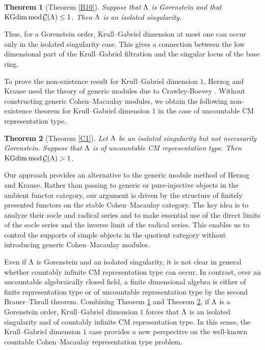 \documentclass[11pt]{amsart}
\newtheorem{theorem}{Theorem}[section]
\theoremstyle{definition}
\numberwithin{equation}{section}
\begin{document}
\begin{theorem}[Theorem \ref{B10}]\label{Intro2}
Suppose that $\Lambda$ is Gorenstein and that $\mathrm{KGdim}\, {\mathrm{mod}}\,\underline{{\mathcal C}}(\Lambda ) \le 1$. 
Then $\Lambda$ is an isolated singularity. 
\end{theorem}

Thus, for a Gorenstein order, Krull--Gabriel dimension at most one can occur only in the isolated singularity case.  
This gives a connection between the low dimensional part of the Krull--Gabriel filtration and the singular locus of the base ring.


To prove the non-existence result for Krull--Gabriel dimension $1$, Herzog and Krause used the theory of generic modules due to Crawley-Boevey \cite{CB92}. 
Without constructing generic Cohen--Macaulay modules, we obtain the following non-existence theorem for Krull--Gabriel dimension $1$ in the case of uncountable CM representation type. 

\begin{theorem}[Theorem \ref{C1}]\label{Intro3}
Let $\Lambda$ be an isolated singularity but not necessarily Gorenstein. 
Suppose that $\Lambda$ is of uncountable CM representation type. 
Then $\mathrm{KGdim}\, {\mathrm{mod}}\,\underline{{\mathcal C}}(\Lambda ) > 1$. 
\end{theorem}

Our approach provides an alternative to the generic module method of Herzog and Krause. 
Rather than passing to generic or pure-injective objects in the ambient functor category, our argument is driven by the structure of finitely presented functors on the stable Cohen--Macaulay category.
The key idea is to analyze their socle and radical series and to make essential use of the direct limits of the socle series and the inverse limit of the radical series.
This enables us to control the supports of simple objects in the quotient category without introducing generic Cohen--Macaulay modules. 

Even if $\Lambda$ is Gorenstein and an isolated singularity, it is not clear in general whether countably infinite CM representation type can occur. 
In contrast, over an uncountable algebraically closed field, a finite dimensional algebra is either of finite representation type or  of uncountable representation type by the second Brauer--Thrall theorem. 
Combining Theorem \ref{Intro2} and Theorem \ref{Intro3}, if $\Lambda$ is a Gorenstein order, Krull--Gabriel dimension $1$ forces that $\Lambda$ is an isolated singularity and of countably infinite CM representation type. 
In this sense, the Krull--Gabriel dimension $1$ case provides a new perspective on the well-known countable Cohen--Macaulay representation type problem.
\end{document}
